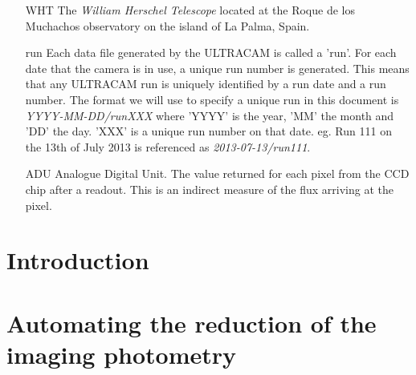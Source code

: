 \documentclass[11pt,a4paper]{report}      %
\begin{document}
\begin{thesisabbreviations}       %

	\begin{itemize}
		\item[WHT]The \emph{William Herschel Telescope} located at the Roque de los Muchachos observatory on the island of La Palma, Spain. 
		\item[run]Each data file generated by the ULTRACAM is called a 'run'. For each date that the camera is in use, a unique run number is generated. This means that any ULTRACAM run is uniquely identified by a run date and a run number. The format we will use to specify a unique run in this document is \emph{YYYY-MM-DD/runXXX} where 'YYYY' is the year, 'MM'  the month and 'DD' the day. 'XXX' is a unique run number on that date. eg. Run 111 on the 13th of July 2013 is referenced as \emph{2013-07-13/run111}. 
		\item[ADU]Analogue Digital Unit. The value returned for each pixel from the CCD chip after a readout. This is an indirect measure of the flux arriving at the pixel.  
	\end{itemize}
\end{thesisabbreviations}         %



\chapter{Introduction}\label{chap:introduction}


\chapter{Automating the reduction of the imaging photometry}\label{chap:datareduction}

\end{document}
